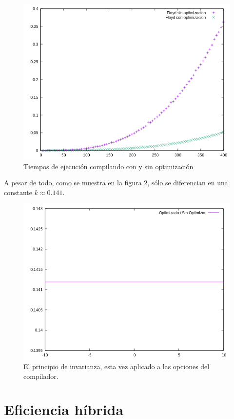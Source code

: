 \documentclass{article}
\begin{document}
\begin{figure}[H]
	\centering
	\includegraphics[totalheight=8cm]{img/optimizacion_floyd}
	\caption{Tiempos de ejecución compilando con y sin optimización}
	\label{fig:optimizacion_floyd}
\end{figure}

A pesar de todo, como se muestra en la figura \ref{fig:optimizacion_cociente}, sólo se diferencian en una constante $k \approx 0.141 $.
\begin{figure}[H]
	\centering
	\includegraphics[totalheight=8cm]{img/optimizacion_cociente}
	\caption{El principio de invarianza, esta vez aplicado a las opciones del compilador.}
	\label{fig:optimizacion_cociente}
\end{figure}

\section{Eficiencia híbrida}
\end{document}
